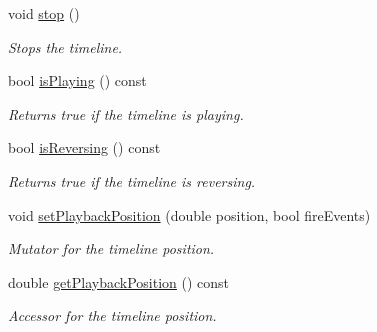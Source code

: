 \begin{DoxyCompactItemize}
\mbox{\label{class_arcana_1_1_timeline_abcefca3d28a1a5ad95fb4e84d980a3de}} 
void \mbox{\hyperlink{class_arcana_1_1_timeline_abcefca3d28a1a5ad95fb4e84d980a3de}{stop}} ()
\begin{DoxyCompactList}\small\item\em Stops the timeline. \end{DoxyCompactList}\item 
\mbox{\label{class_arcana_1_1_timeline_ae5b227828f15f1066e30a5341f7923b3}} 
bool \mbox{\hyperlink{class_arcana_1_1_timeline_ae5b227828f15f1066e30a5341f7923b3}{is\+Playing}} () const
\begin{DoxyCompactList}\small\item\em Returns true if the timeline is playing. \end{DoxyCompactList}\item 
\mbox{\label{class_arcana_1_1_timeline_a14af7d00e66fe57110340a824295805c}} 
bool \mbox{\hyperlink{class_arcana_1_1_timeline_a14af7d00e66fe57110340a824295805c}{is\+Reversing}} () const
\begin{DoxyCompactList}\small\item\em Returns true if the timeline is reversing. \end{DoxyCompactList}\item 
void \mbox{\hyperlink{class_arcana_1_1_timeline_afba20a0d02f23e9bbf752f6c1a7a589b}{set\+Playback\+Position}} (double position, bool fire\+Events)
\begin{DoxyCompactList}\small\item\em Mutator for the timeline position. \end{DoxyCompactList}\item 
\mbox{\label{class_arcana_1_1_timeline_ad144e4650f3b95c5df1608872b586e16}} 
double \mbox{\hyperlink{class_arcana_1_1_timeline_ad144e4650f3b95c5df1608872b586e16}{get\+Playback\+Position}} () const
\begin{DoxyCompactList}\small\item\em Accessor for the timeline position. \end{DoxyCompactList}\item 
\mbox{\label{class_arcana_1_1_timeline_ab9fb7b10c29cfda510feb40816be971c}} 

\end{DoxyCompactItemize}
